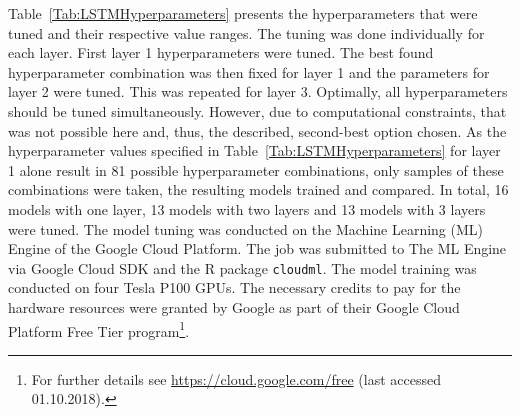 Table~\ref{Tab:LSTMHyperparameters} presents the hyperparameters that were tuned and their respective value ranges. The tuning was done individually for each layer. First layer 1 hyperparameters were tuned. The best found hyperparameter combination was then fixed for layer 1 and the parameters for layer 2 were tuned. This was repeated for layer 3. Optimally, all hyperparameters should be tuned simultaneously. However, due to computational constraints, that was not possible here and, thus, the described, second-best option chosen. As the hyperparameter values specified in Table~\ref{Tab:LSTMHyperparameters} for layer 1 alone result in 81 possible hyperparameter combinations, only samples of these combinations were taken, the resulting models trained and compared. In total, 16 models with one layer, 13 models with two layers and 13 models with 3 layers were tuned. The model tuning was conducted on the Machine Learning (ML) Engine of the Google Cloud Platform. The job was submitted to The ML Engine via Google Cloud SDK and the R package \texttt{cloudml}. The model training was conducted on four Tesla P100 GPUs. The necessary credits to pay for the hardware resources were granted by Google as part of their Google Cloud Platform Free Tier program\footnote{For further details see \href{https://cloud.google.com/free}{https://cloud.google.com/free} (last accessed 01.10.2018).}.

